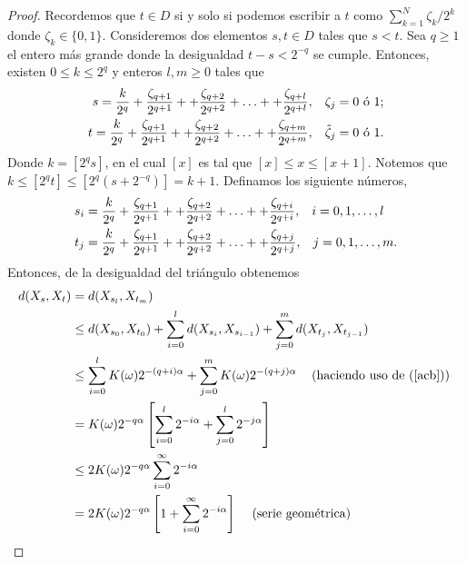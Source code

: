 \begin{proof}
Recordemos que $t \in D$ si y solo si podemos escribir a $t$ como $\sum_{k=1}^N \zeta_k / 2^k$ donde $\zeta_k \in \{0, 1\}$. Consideremos dos elementos $s, t \in D$ tales que $s < t$. Sea $q \geq 1$ el entero más grande donde la desigualdad $t - s < 2^{-q}$ se cumple. Entonces, existen $0 \leq k \leq 2^{q}$ y enteros $l, m \geq 0$ tales que
	\begin{align*}
	s = \frac{k}{2^q} + \frac{\zeta_{q+1}}{2^{q+1}} + + \frac{\zeta_{q+2}}{2^{q+2}} + \ldots + + \frac{\zeta_{q+l}}{2^{q+l}}, \hspace{0.3cm} \zeta_j = 0 \text{ ó } 1; \\
	t = \frac{k}{2^q} + \frac{\zeta_{q+1}}{2^{q+1}} + + \frac{\zeta_{q+2}}{2^{q+2}} + \ldots + + \frac{\zeta_{q+m}}{2^{q+m}}, \hspace{0.3cm} \tilde{\zeta}_j = 0 \text{ ó } 1.
	\end{align*}
Donde $k = [2^q s]$, en el cual $[x]$ es tal que $[x] \leq x \leq [x+1]$. Notemos que $k \leq [2^q t] \leq [2^q (s + 2^{-q})] = k+1$. Definamos los siguiente números, 
	\begin{align*}
	s_i & = \frac{k}{2^q} + \frac{\zeta_{q+1}}{2^{q+1}} + + \frac{\zeta_{q+2}}{2^{q+2}} + \ldots + + \frac{\zeta_{q+i}}{2^{q+i}}, \hspace{0.3cm} i = 0, 1, \ldots, l \\
	t_j & = \frac{k}{2^q} + \frac{\zeta_{q+1}}{2^{q+1}} + + \frac{\zeta_{q+2}}{2^{q+2}} + \ldots + + \frac{\zeta_{q+j}}{2^{q+j}}, \hspace{0.3cm} j = 0, 1, \ldots, m.
	\end{align*}
Entonces, de la desigualdad del triángulo obtenemos
	\begin{align*}
	d(X_s, X_t) & = d(X_{s_l}, X_{t_m}) \\
	& \leq d(X_{s_0}, X_{t_0}) + \sum_{i=0}^l d(X_{s_i}, X_{s_{i-1}}) + \sum_{j=0}^m d(X_{t_j}, X_{t_{j-1}}) \\
	& \leq \sum_{i=0}^l K(\omega) 2^{-(q+i) \alpha} + \sum_{j=0}^m K(\omega) 2^{-(q+j) \alpha} \hspace{0.3cm} \text{ (haciendo uso de (\ref{acb})) } \\
	& = K(\omega) 2^{-q \alpha} \left[ \sum_{i=0}^l 2^{-i \alpha} + \sum_{j=0}^l 2^{-j \alpha} \right] \\
	& \leq 2K(\omega) 2^{-q \alpha} \sum_{i=0}^{\infty} 2^{-i \alpha} \\
	& = 2K(\omega) 2^{-q \alpha} \left[1 + \sum_{i=0}^{\infty} 2^{-i \alpha} \right]  \hspace{0.3cm} \text{ (serie geométrica) } \\

\end{align*}
\end{proof}
